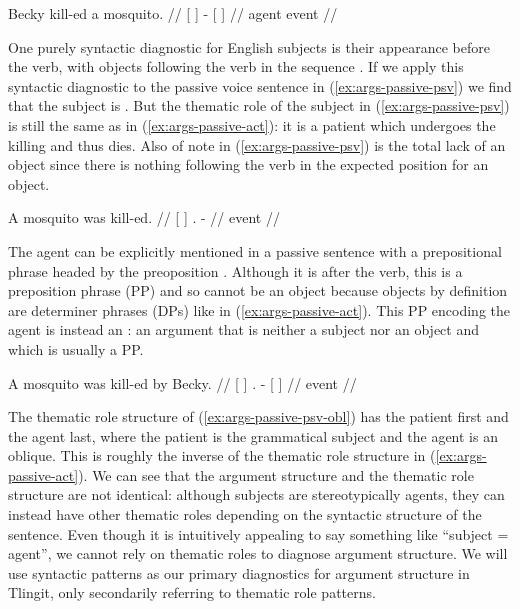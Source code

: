 \ex\label{ex:args-passive-act}%
%
\begingl
	\gla	{} Becky {} kill-ed {} a mosquito. {} //
	\glc	{}[  {}] - {}[   {}] //
	\gld	{} agent {} event {}  {} {} //
\endgl
\xe

One purely syntactic diagnostic for English subjects is their appearance before the verb, with objects following the verb in the sequence . If we apply this syntactic diagnostic to the passive voice sentence in (\ref{ex:args-passive-psv}) we find that the subject is . But the thematic role of the subject  in (\ref{ex:args-passive-psv}) is still the same as in (\ref{ex:args-passive-act}): it is a patient which undergoes the killing and thus dies. Also of note in (\ref{ex:args-passive-psv}) is the total lack of an object since there is nothing following the verb in the expected position for an object.

\ex\label{ex:args-passive-psv}%
%
\begingl
	\gla	{} A mosquito {} was kill-ed. //
	\glc	{}[   {}] . - //
	\gld	{}  {} {} {} event //
\endgl
\xe

The agent can be explicitly mentioned in a passive sentence with a prepositional phrase headed by the preoposition . Although it is after the verb, this is a preposition phrase (PP) and so cannot be an object because objects by definition are determiner phrases (DPs) like  in (\ref{ex:args-passive-act}). This PP  encoding the agent is instead an : an argument that is neither a subject nor an object and which is usually a PP.

\ex\label{ex:args-passive-psv-obl}%
%
\begingl
	\gla	{} A mosquito {} was kill-ed {} by Becky. {} //
	\glc	{}[   {}] . - {}[   {}] //
	\gld	{}  {} {} {} event {}  {} {} //
\endgl
\xe

The thematic role structure of (\ref{ex:args-passive-psv-obl}) has the patient first and the agent last, where the patient is the grammatical subject and the agent is an oblique. This is roughly the inverse of the thematic role structure in (\ref{ex:args-passive-act}). We can see that the argument structure and the thematic role structure are not identical: although subjects are stereotypically agents, they can instead have other thematic roles depending on the syntactic structure of the sentence. Even though it is intuitively appealing to say something like “subject = agent”, we cannot rely on thematic roles to diagnose argument structure. We will use syntactic patterns as our primary diagnostics for argument structure in Tlingit, only secondarily referring to thematic role patterns.

